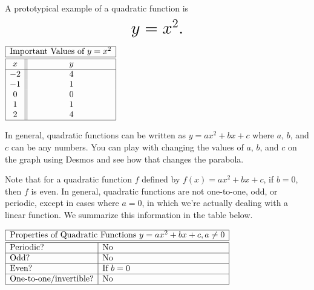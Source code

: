 \documentclass[nooutcomes]{ximera}
\begin{document}
\begin{example}
A prototypical example of a quadratic function is $$ \mbox{\huge $y=x^2.$}$$

\begin{image}
\end{image}

\begin{center}
\(
\begin{array}{ |c || c|  }
 \hline
 \multicolumn{2}{|c|}{\text{\normalfont Important Values of } y=x^2} \\
\hline
 \hline
 x & y\\
 \hline
 -2&4\\
 -1&1\\
 0&0\\
 1&1\\
 2&4\\
 \hline
\end{array}
\)
\end{center}
\end{example}

In general, quadratic functions can be written as $y=ax^2+bx+c$ where $a$, $b$, and $c$ can be any numbers.  You can play with changing the values of $a$, $b$, and $c$ on the graph using Desmos and see how that changes the parabola.  

\begin{center}  
\end{center}

Note that for a quadratic function $f$ defined by $f(x) = ax^2 + bx + c$, if $b = 0$, then $f$ is even. In general, quadratic functions are not one-to-one, odd, or periodic, except in cases where $a = 0$, in which we're actually dealing with a linear function. We summarize this information in the table below.

\begin{center}
$
\begin{array}{|l|l|}
 \hline
 \multicolumn{2}{|c|}{\text{\normalfont Properties of Quadratic Functions } y=ax^2 + bx + c, a \ne 0} \\
\hline
 \hline
\text{Periodic?} & \text{No} \\ \hline
\text{Odd?} & \text{No} \\ \hline
\text{Even?} & \text{If } b = 0 \\ \hline
\text{One-to-one/invertible?} & \text{No}\\ \hline
\end{array}
$
\end{center}
\end{document}
